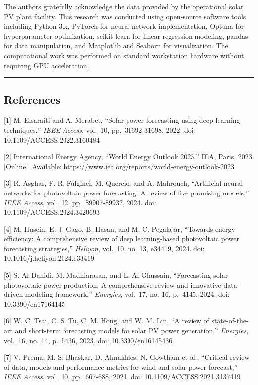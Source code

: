 \documentclass[
  11pt,
]{article}
\begin{document}
The authors gratefully acknowledge the data provided by the operational
solar PV plant facility. This research was conducted using open-source
software tools including Python 3.x, PyTorch for neural network
implementation, Optuna for hyperparameter optimization, scikit-learn for
linear regression modeling, pandas for data manipulation, and Matplotlib
and Seaborn for visualization. The computational work was performed on
standard workstation hardware without requiring GPU acceleration.

\begin{center}\rule{0.5\linewidth}{0.5pt}\end{center}

\subsection{References}\label{references}

{[}1{]} M. Elsaraiti and A. Merabet, “Solar power forecasting using deep
learning techniques,” \emph{IEEE Access}, vol.~10, pp.~31692-31698,
2022. doi: 10.1109/ACCESS.2022.3160484

{[}2{]} International Energy Agency, “World Energy Outlook 2023,” IEA,
Paris, 2023. {[}Online{]}. Available:
https://www.iea.org/reports/world-energy-outlook-2023

{[}3{]} R. Asghar, F. R. Fulginei, M. Quercio, and A. Mahrouch,
“Artificial neural networks for photovoltaic power forecasting: A review
of five promising models,” \emph{IEEE Access}, vol.~12, pp.~89907-89932,
2024. doi: 10.1109/ACCESS.2024.3420693

{[}4{]} M. Husein, E. J. Gago, B. Hasan, and M. C. Pegalajar, “Towards
energy efficiency: A comprehensive review of deep learning-based
photovoltaic power forecasting strategies,” \emph{Heliyon}, vol.~10, no.
13, e34419, 2024. doi: 10.1016/j.heliyon.2024.e33419

{[}5{]} S. Al-Dahidi, M. Madhiarasan, and L. Al-Ghussain, “Forecasting
solar photovoltaic power production: A comprehensive review and
innovative data-driven modeling framework,” \emph{Energies}, vol.~17,
no. 16, p.~4145, 2024. doi: 10.3390/en17164145

{[}6{]} W. C. Tsai, C. S. Tu, C. M. Hong, and W. M. Lin, “A review of
state-of-the-art and short-term forecasting models for solar PV power
generation,” \emph{Energies}, vol.~16, no. 14, p.~5436, 2023. doi:
10.3390/en16145436

{[}7{]} V. Prema, M. S. Bhaskar, D. Almakhles, N. Gowtham et al.,
“Critical review of data, models and performance metrics for wind and
solar power forecast,” \emph{IEEE Access}, vol.~10, pp.~667-688, 2021.
doi: 10.1109/ACCESS.2021.3137419
\end{document}
